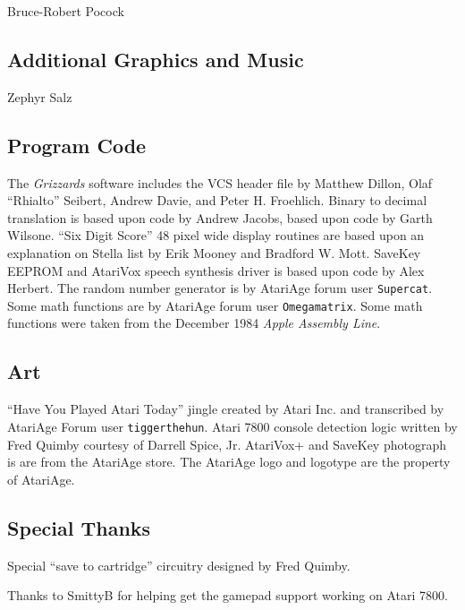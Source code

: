 \documentclass[10pt,twocolumn,openany,article]{memoir}
\begin{document}
Bruce-Robert Pocock

\subsection{Additional Graphics and Music}

Zephyr Salz

\subsection{Program Code}

The \textit{Grizzards} software includes the  VCS header file by Matthew
Dillon, Olaf ``Rhialto'' Seibert, Andrew  Davie, and Peter H. Froehlich.
Binary to decimal translation is based upon code by Andrew Jacobs, based
upon code  by Garth Wilsone. ``Six  Digit Score'' 48 pixel  wide display
routines are based upon an explanation on Stella list by Erik Mooney and
Bradford W. Mott. \ifdefined\ATARIAGESAVE\else  SaveKey EEPROM and \fi{}
AtariVox speech  synthesis driver  is based upon  code by  Alex Herbert.
The random number generator is by AtariAge forum user \texttt{Supercat}.
Some math  functions are by AtariAge  forum user \texttt{Omega\-matrix}.
Some  math functions  were taken  from the  December 1984  \textit{Apple
  Assembly  Line}. 

\subsection{Art}

``Have  You Played  Atari Today''  jingle created  by
Atari    Inc.     and    transcribed    by    AtariAge     Forum    user
\texttt{tigger\-the\-hun}. Atari 7800 console detection logic written by
Fred    Quimby    courtesy    of   Darrell    Spice,    Jr.    AtariVox+
\ifdefined\ATARIAGESAVE\else          and         SaveKey          \fi{}
photograph\ifdefined\ATARIAGESAVE{}  is    are  \fi{}  from  the
AtariAge store.  \ifdefined\ATARIAGESAVE The AtariAge logo  and logotype
are the property of AtariAge. \fi

\subsection{Special Thanks}

Special ``save to cartridge'' circuitry designed by Fred Quimby.

Thanks  to  SmittyB for  helping  get  the  gamepad support  working  on
Atari 7800.
\end{document}
